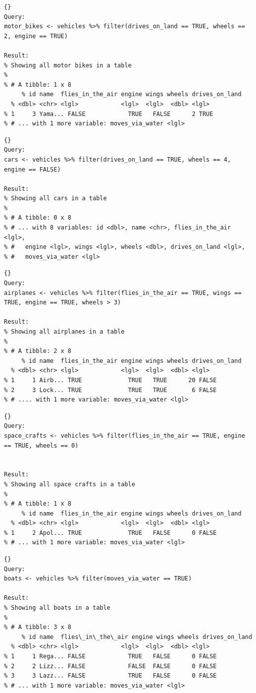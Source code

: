 \begin{lstlisting}{}
Query:
motor_bikes <- vehicles %>% filter(drives_on_land == TRUE, wheels == 2, engine == TRUE)

Result:
% Showing all motor bikes in a table
%
% # A tibble: 1 x 8
     % id name  flies_in_the_air engine wings wheels drives_on_land
  % <dbl> <chr> <lgl>            <lgl>  <lgl>  <dbl> <lgl>
% 1     3 Yama... FALSE            TRUE   FALSE      2 TRUE
% # ... with 1 more variable: moves_via_water <lgl>
\end{lstlisting}

\begin{lstlisting}{}
Query:
cars <- vehicles %>% filter(drives_on_land == TRUE, wheels == 4, engine == FALSE)

Result:
% Showing all cars in a table
%
% # A tibble: 0 x 8
% # ... with 8 variables: id <dbl>, name <chr>, flies_in_the_air <lgl>,
% #   engine <lgl>, wings <lgl>, wheels <dbl>, drives_on_land <lgl>,
% #   moves_via_water <lgl>
\end{lstlisting}

\begin{lstlisting}{}
Query:
airplanes <- vehicles %>% filter(flies_in_the_air == TRUE, wings == TRUE, engine == TRUE, wheels > 3)

Result:
% Showing all airplanes in a table
%
% # A tibble: 2 x 8
     % id name  flies_in_the_air engine wings wheels drives_on_land
  % <dbl> <chr> <lgl>            <lgl>  <lgl>  <dbl> <lgl>
% 1     1 Airb... TRUE             TRUE   TRUE      20 FALSE
% 2     3 Lock... TRUE             TRUE   TRUE       6 FALSE
% # .... with 1 more variable: moves_via_water <lgl>
\end{lstlisting}

\begin{lstlisting}{}
Query:
space_crafts <- vehicles %>% filter(flies_in_the_air == TRUE, engine == TRUE, wheels == 0)


Result:
% Showing all space crafts in a table
%
% # A tibble: 1 x 8
     % id name  flies_in_the_air engine wings wheels drives_on_land
  % <dbl> <chr> <lgl>            <lgl>  <lgl>  <dbl> <lgl>
% 1     2 Apol... TRUE             TRUE   FALSE      0 FALSE
% # ... with 1 more variable: moves_via_water <lgl>
\end{lstlisting}

\begin{lstlisting}{}
Query:
boats <- vehicles %>% filter(moves_via_water == TRUE)

Result:
% Showing all boats in a table
%
% # A tibble: 3 x 8
     % id name  flies\_in\_the\_air engine wings wheels drives_on_land
  % <dbl> <chr> <lgl>            <lgl>  <lgl>  <dbl> <lgl>
% 1     1 Rega... FALSE            TRUE   FALSE      0 FALSE
% 2     2 Lizz... FALSE            FALSE  FALSE      0 FALSE
% 3     3 Lazz... FALSE            TRUE   FALSE      0 FALSE
% # ... with 1 more variable: moves_via_water <lgl>
\end{lstlisting}

